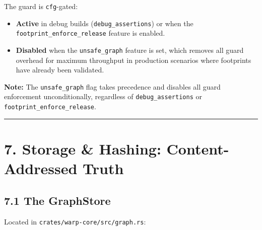 \documentclass[
  11pt,
]{book}
\begin{document}
The guard is \texttt{cfg}-gated:

\begin{itemize}
\item \textbf{Active} in debug builds (\texttt{debug\_assertions}) or when
  the \texttt{footprint\_enforce\_release} feature is enabled.
\item \textbf{Disabled} when the \texttt{unsafe\_graph} feature is set,
  which removes all guard overhead for maximum throughput in production
  scenarios where footprints have already been validated.
\end{itemize}

\textbf{Note:} The \texttt{unsafe\_graph} flag takes precedence and disables all
guard enforcement unconditionally, regardless of \texttt{debug\_assertions} or
\texttt{footprint\_enforce\_release}.

\begin{center}\rule{0.5\linewidth}{0.5pt}\end{center}

\section{7. Storage \& Hashing: Content-Addressed
Truth}\label{storage-hashing-content-addressed-truth}

\subsection{7.1 The GraphStore}\label{the-graphstore}

Located in \texttt{crates/warp-core/src/graph.rs}:
\end{document}
